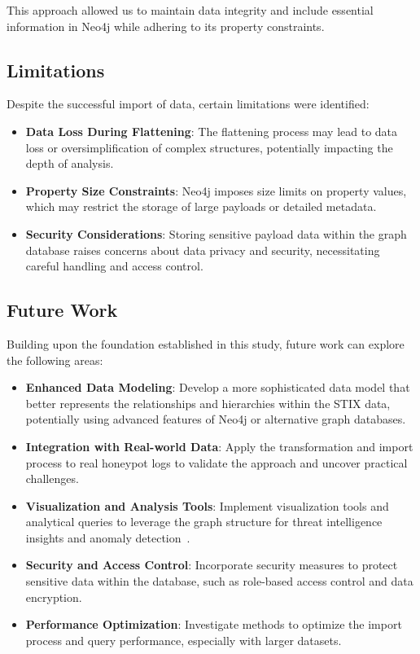 \documentclass[conference]{IEEEtran}
\begin{document}
This approach allowed us to maintain data integrity and include essential information in Neo4j while adhering to its property constraints.

\subsection{Limitations}

Despite the successful import of data, certain limitations were identified:

\begin{itemize}
    \item \textbf{Data Loss During Flattening}: The flattening process may lead to data loss or oversimplification of complex structures, potentially impacting the depth of analysis.
    \item \textbf{Property Size Constraints}: Neo4j imposes size limits on property values, which may restrict the storage of large payloads or detailed metadata.
    \item \textbf{Security Considerations}: Storing sensitive payload data within the graph database raises concerns about data privacy and security, necessitating careful handling and access control.
\end{itemize}

\subsection{Future Work}

Building upon the foundation established in this study, future work can explore the following areas:

\begin{itemize}
    \item \textbf{Enhanced Data Modeling}: Develop a more sophisticated data model that better represents the relationships and hierarchies within the STIX data, potentially using advanced features of Neo4j or alternative graph databases.
    \item \textbf{Integration with Real-world Data}: Apply the transformation and import process to real honeypot logs to validate the approach and uncover practical challenges.
    \item \textbf{Visualization and Analysis Tools}: Implement visualization tools and analytical queries to leverage the graph structure for threat intelligence insights and anomaly detection~\cite{barnum2014standardizing}.
    \item \textbf{Security and Access Control}: Incorporate security measures to protect sensitive data within the database, such as role-based access control and data encryption.
    \item \textbf{Performance Optimization}: Investigate methods to optimize the import process and query performance, especially with larger datasets.
\end{itemize}
\end{document}
